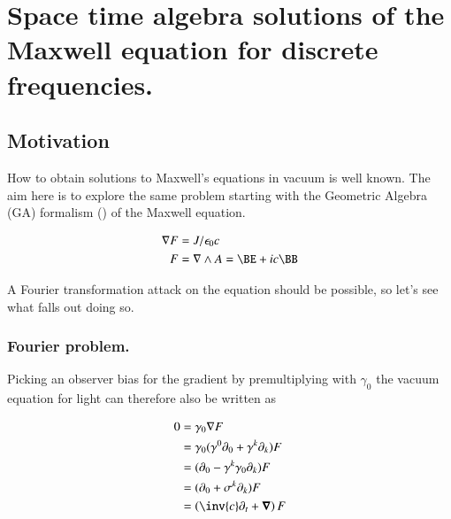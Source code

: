 %

\chapter{Space time algebra solutions of the Maxwell equation for discrete frequencies.}
\label{chap:maxwellVacuum}
\date{July 2, 2009 $RCSfile: maxwellVacuum.tex,v $ Last $Revision: 1.8 $ $Date: 2009/08/06 09:35:17 $}

\beginArtWithToc

\section{Motivation}

How to obtain solutions to Maxwell's equations in vacuum is well known.  The aim here is to explore the same problem starting with the Geometric Algebra (GA) formalism (\cite{doran2003gap}) of the Maxwell equation.

\begin{align}\label{eqn:maxwellVacuum:maxwell}
\grad F &= J/\epsilon_0 c \\
F &= \grad \wedge A = \BE + i c \BB
\end{align}

A Fourier transformation attack on the equation should be possible, so let's see what falls out doing so.

\subsection{Fourier problem.}

Picking an observer bias for the gradient by premultiplying with $\gamma_0$ the vacuum equation for light can therefore also be written as

\begin{align*}
0
&= \gamma_0 \grad F \\
&= \gamma_0 (\gamma^0 \partial_0 + \gamma^k \partial_k) F \\
&= (\partial_0 - \gamma^k \gamma_0 \partial_k) F \\
&= (\partial_0 + \sigma^k \partial_k) F \\
&= \left(\inv{c}\partial_t + \spacegrad \right) F \\
\end{align*}

